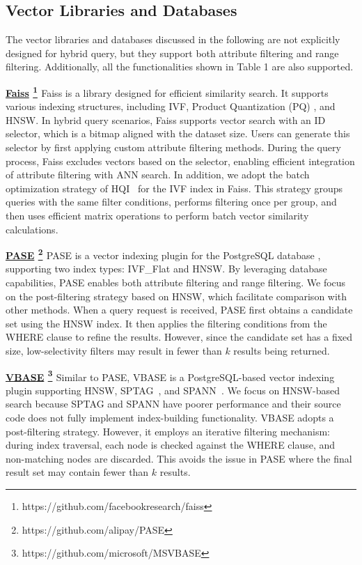 \documentclass[sigconf, nonacm]{acmart}
\begin{document}
	
	
	\subsection{Vector Libraries and Databases}
	
	The vector libraries and databases discussed in the following are not explicitly designed for hybrid query, but they support both attribute filtering and range filtering. Additionally, all the functionalities shown in Table 1 are also supported.
	
	\noindent\textbf{\underline{Faiss} \footnote{https://github.com/facebookresearch/faiss} \cite{Faiss}}
	Faiss is a library designed for efficient similarity search. It supports various indexing structures, including IVF, Product Quantization (PQ) \cite{PQ}, and HNSW. In hybrid query scenarios, Faiss supports vector search with an ID selector, which is a bitmap aligned with the dataset size. Users can generate this selector by first applying custom attribute filtering methods. During the query process, Faiss excludes vectors based on the selector, enabling efficient integration of attribute filtering with ANN search. In addition, we adopt the batch optimization strategy of HQI~\cite{HQI} for the IVF index in Faiss. This strategy groups queries with the same filter conditions, performs filtering once per group, and then uses efficient matrix operations to perform batch vector similarity calculations.
	
	
	\noindent\textbf{\underline{PASE} \footnote{https://github.com/alipay/PASE} \cite{pase}}
	PASE is a vector indexing plugin for the PostgreSQL database \cite{postgresql13.4}, supporting two index types: IVF\_Flat \cite{johnson2019billion} and HNSW. By leveraging database capabilities, PASE enables both attribute filtering and range filtering. We focus on the post-filtering strategy based on HNSW, which facilitate comparison with other methods. When a query request is received, PASE first obtains a candidate set using the HNSW index. It then applies the filtering conditions from the WHERE clause to refine the results. However, since the candidate set has a fixed size, low-selectivity filters may result in fewer than $k$ results being returned.
	
	
	\noindent\textbf{\underline{VBASE} \footnote{https://github.com/microsoft/MSVBASE} \cite{vbase}}
	Similar to PASE, VBASE is a PostgreSQL-based vector indexing plugin supporting HNSW, SPTAG~\cite{sptag}, and SPANN~\cite{spann}. We focus on HNSW-based search because SPTAG and SPANN have poorer performance and their source code does not fully implement index-building functionality. VBASE adopts a post-filtering strategy. However, it employs an iterative filtering mechanism: during index traversal, each node is checked against the WHERE clause, and non-matching nodes are discarded. This avoids the issue in PASE where the final result set may contain fewer than $k$ results.
	
\end{document}
